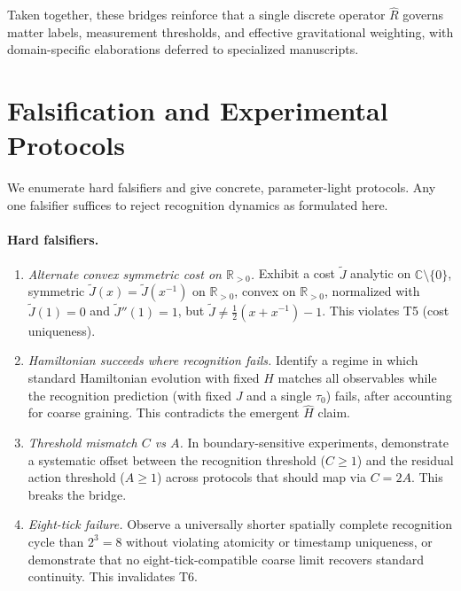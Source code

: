 \documentclass[aps,prx,twocolumn,superscriptaddress,nofootinbib]{revtex4-2}
\newcommand{\Rhat}{\hat{R}}
\newcommand{\Hhat}{\hat{H}}
\newcommand{\Jcost}{J}
\newcommand{\Ccost}{C}
\newcommand{\TauZero}{\tau_{0}}
\begin{document}
Taken together, these bridges reinforce that a single discrete operator \(\Rhat\) governs matter labels, measurement thresholds, and effective gravitational weighting, with domain-specific elaborations deferred to specialized manuscripts.

\section{Falsification and Experimental Protocols}\label{sec:falsification}
We enumerate hard falsifiers and give concrete, parameter-light protocols. Any one falsifier suffices to reject recognition dynamics as formulated here.

\paragraph*{Hard falsifiers.}
\begin{enumerate}
  \item \emph{Alternate convex symmetric cost on \(\mathbb{R}_{>0}\).} Exhibit a cost \(\tilde J\) analytic on \(\mathbb{C}\setminus\{0\}\), symmetric \(\tilde J(x)=\tilde J(x^{-1})\) on \(\mathbb{R}_{>0}\), convex on \(\mathbb{R}_{>0}\), normalized with \(\tilde J(1)=0\) and \(\tilde J''(1)=1\), but \(\tilde J\neq \tfrac12(x+x^{-1})-1\). This violates T5 (cost uniqueness).
  \item \emph{Hamiltonian succeeds where recognition fails.} Identify a regime in which standard Hamiltonian evolution with fixed \(\Hhat\) matches all observables while the recognition prediction (with fixed \(\Jcost\) and a single \(\TauZero\)) fails, after accounting for coarse graining. This contradicts the emergent \(\Hhat\) claim.
  \item \emph{Threshold mismatch \(\Ccost\) vs \(A\).} In boundary-sensitive experiments, demonstrate a systematic offset between the recognition threshold (\(\Ccost\ge 1\)) and the residual action threshold (\(A\ge 1\)) across protocols that should map via \(\Ccost=2A\). This breaks the bridge.
  \item \emph{Eight-tick failure.} Observe a universally shorter spatially complete recognition cycle than \(2^3=8\) without violating atomicity or timestamp uniqueness, or demonstrate that no eight-tick-compatible coarse limit recovers standard continuity. This invalidates T6.
\end{enumerate}
\end{document}
